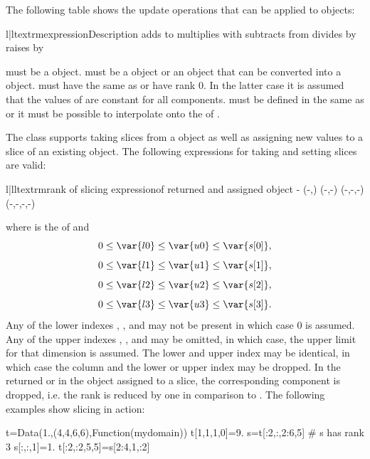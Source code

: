 The following table shows the update operations that can be applied to
\Data objects:
\begin{tableii}{l|l}{textrm}{expression}{Description}
 {adds  to  \index{+}}
 {multiplies  with  \index{*}}
 {subtracts  from \index{-}}
 {divides  by  \index{/}}
 {raises  by  \index{**}}
\end{tableii}
 must be a \Data object.  must be a
\Data object or an object that can be converted into a
\Data object.  must have the same \Shape as
 or have rank 0.  In the latter case it is
assumed that the values of  are constant for all
components.  must be defined in the same \FunctionSpace as
 or it must be possible to interpolate  onto the
\FunctionSpace of .

The \Data class supports taking slices from a \Data object as well as assigning new values to a slice of an existing
\Data object. 
The following expressions for taking and setting slices are valid:
\begin{tableiii}{l|ll}{textrm}{rank of }{slicing expression}{\Shape of returned and assigned object}
                      {-}
                   {(-,)}
             {(-,-)}
      {(-,-,-)}
 {(-,-,-,-)}
\end{tableiii}
where  is the \Shape of  and 
\[0 \le \var{l0} \le \var{u0} \le \var{s[0]},\]
\[0 \le \var{l1} \le \var{u1} \le \var{s[1]},\] 
\[0 \le \var{l2} \le \var{u2} \le \var{s[2]},\] 
\[0 \le \var{l3} \le \var{u3} \le \var{s[3]}.\]
Any of the lower indexes , ,  and  may not be present in which case 
$0$ is assumed. 
Any of the upper indexes , ,  and  may be omitted, in which case, the upper limit for that dimension is assumed. 
The lower and upper index may be identical, in which case the column and the lower or upper
index may be dropped. In the returned or in the object assigned to a slice, the corresponding component is dropped,
i.e. the rank is reduced by one in comparison to .
The following examples show slicing in action:
\begin{python}
  t=Data(1.,(4,4,6,6),Function(mydomain))
  t[1,1,1,0]=9.
  s=t[:2,:,2:6,5] # s has rank 3
  s[:,:,1]=1.
  t[:2,:2,5,5]=s[2:4,1,:2]
\end{python}

